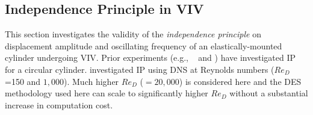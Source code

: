 \subsection{Independence Principle in VIV}
\label{sec:IPinVIV}
%
This section investigates the validity of the {\em independence principle} on
displacement amplitude and oscillating frequency of an elastically-mounted
cylinder undergoing VIV. Prior experiments (e.g., ~\citet{jain2013vortex} and
\citet{franzini2013one}) have investigated IP for a circular cylinder.
\citet{zhao2015validity} investigated IP using DNS at Reynolds numbers
($Re_D$=150 and $1,000$). Much higher $Re_D$ ($=20,000$) is considered here and
the DES methodology used here can scale to significantly higher $Re_D$ without
a substantial increase in computation cost.

